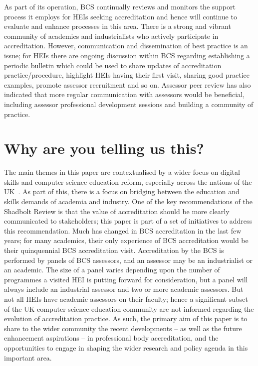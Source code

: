 \documentclass[sigconf]{acmart}
\begin{document}
As part of its operation, BCS continually reviews and monitors the
support process it employs for HEIs seeking accreditation and hence
will continue to evaluate and enhance processes in this area. There is
a strong and vibrant community of academics and industrialists who
actively participate in accreditation. However, communication and
dissemination of best practice is an issue; for HEIs there are ongoing
discussion within BCS regarding establishing a periodic bulletin which
could be used to share updates of accreditation practice/procedure,
highlight HEIs having their first visit, sharing good practice
examples, promote assessor recruitment and so on. Assessor peer review
has also indicated that more regular communication with assessors
would be beneficial, including assessor professional development
sessions and building a community of practice.

\section{Why are you telling us this?}	

The main themes in this paper are contextualised by a wider focus on
digital skills and computer science education reform, especially
across the nations of the
UK~\cite{brown-et-al:toce2014,tryfonas+crick:petra2018}. As part of
this, there is a focus on bridging between the education and skills
demands of academia and industry. One of the key recommendations of
the Shadbolt Review is that the value of accreditation should be more
clearly communicated to stakeholders; this paper is part of a set of
initiatives to address this recommendation.  Much has changed in BCS
accreditation in the last few years; for many academics, their only
experience of BCS accreditation would be their quinquennial BCS
accreditation visit. Accreditation by the BCS is performed by panels
of BCS assessors, and an assessor may be an industrialist or an
academic. The size of a panel varies depending upon the number of
programmes a visited HEI is putting forward for consideration, but a
panel will always include an industrial assessor and two or more
academic assessors. But not all HEIs have academic assessors on their
faculty; hence a significant subset of the UK computer science
education community are not informed regarding the evolution of
accreditation practice. As such, the primary aim of this paper is to
share to the wider community the recent developments -- as well as the
future enhancement aspirations -- in professional body accreditation,
and the opportunities to engage in shaping the wider research and
policy agenda in this important area.
\end{document}
